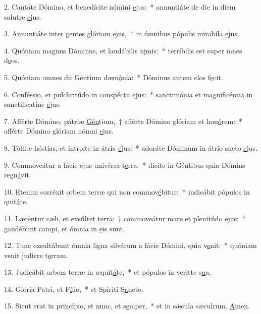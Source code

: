 2. Cantáte Dómino, et benedícite nómini \uline{e}jus:~* annuntiáte de die in diem salutre \uline{e}jus.\par 
3. Annuntiáte inter gentes glóriam \uline{e}jus,~* in ómnibus pópulis mirabíla \uline{e}jus.\par 
4. Quóniam magnus Dóminus, et laudábilis n\uline{i}mis:~* terríbilis est super mnes d\uline{e}os.\par 
5. Quóniam omnes dii Géntium dæm\uline{ó}nia:~* Dóminus autem clos f\uline{e}cit.\par 
6. Conféssio, et pulchritúdo in conspéctu \uline{e}jus:~* sanctimónia et magnificéntia in sanctificatine \uline{e}jus.\par 
7. Afférte Dómino, pátriæ \uline{Gén}tium,~† afférte Dómino glóriam et hon\uline{ó}rem:~* afférte Dómino glóriam nómni \uline{e}jus.\par 
8. Tóllite hóstias, et introíte in átria \uline{e}jus:~* adoráte Dóminum in átrio sncto \uline{e}jus.\par 
9. Commoveátur a fácie ejus univérsa t\uline{e}rra:~* dícite in Géntibus quia Dómins regn\uline{á}vit.\par 
10. Etenim corréxit orbem terræ qui non commov\uline{é}bitur:~* judicábit pópulos in quit\uline{á}te.\par 
11. Læténtur cæli, et exsúltet \uline{ter}ra:~† commoveátur mare et plenitúdo \uline{e}jus:~* gaudébunt campi, et ómnia  in \uline{e}is sunt.\par 
12. Tunc exsultábunt ómnia ligna silvárum a fácie Dómini, quia v\uline{e}nit:~* quóniam venit judicre t\uline{e}rram.\par 
13. Judicábit orbem terræ in æquit\uline{á}te,~* et pópulos in veritte s\uline{u}a.\par 
14. Glória Patri, et F\uline{í}lio,~* et Spiríti S\uline{a}ncto.\par 
15. Sicut erat in princípio, et nunc, et s\uline{e}mper,~* et in sǽcula sæculrum. \uline{A}men.\par 
